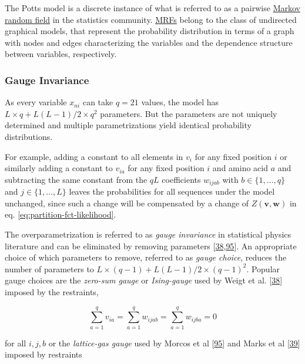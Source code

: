 \documentclass[11pt,a4paper,twoside]{book}
\renewcommand{\v}{\mathbf{v}}
\newcommand{\via}{v_{ia}}
\newcommand{\w}{\mathbf{w}}
\newcommand{\wijab}{w_{ijab}}
\theoremstyle{definition}
\theoremstyle{definition}
\theoremstyle{remark}
\begin{document}
The Potts model is a discrete instance of what is referred to as a
pairwise \protect\hyperlink{abbrev}{Markov random field} in the
statistics community. \protect\hyperlink{abbrev}{MRFs} belong to the
class of undirected graphical models, that represent the probability
distribution in terms of a graph with nodes and edges characterizing the
variables and the dependence structure between variables, respectively.

\subsubsection{Gauge Invariance}\label{gauge-invariance}

As every variable \(x_{ni}\) can take \(q=21\) values, the model has
\(L \! \times \! q + L(L-1)/2 \! \times \! q^2\) parameters. But the
parameters are not uniquely determined and multiple parametrizations
yield identical probability distributions.

For example, adding a constant to all elements in \(v_i\) for any fixed
position \(i\) or similarly adding a constant to \(\via\) for any fixed
position \(i\) and amino acid \(a\) and subtracting the same constant
from the \(qL\) coefficients \(\wijab\) with \(b \in \{1, \ldots, q\}\)
and \(j \in \{1, \ldots, L \}\) leaves the probabilities for all
sequences under the model unchanged, since such a change will be
compensated by a change of \(Z(\v, \w)\) in eq.
\eqref{eq:partition-fct-likelihood}.

The overparametrization is referred to as \emph{gauge invariance} in
statistical physics literature and can be eliminated by removing
parameters
{[}\protect\hyperlink{ref-Weigt2009}{38},\protect\hyperlink{ref-Morcos2011}{95}{]}.
An appropriate choice of which parameters to remove, referred to as
\emph{gauge choice}, reduces the number of parameters to
\(L \! \times \! (q-1) + L(L-1)/2 \! \times \! (q-1)^2\). Popular gauge
choices are the \emph{zero-sum gauge} or \emph{Ising-gauge} used by
Weigt et al. {[}\protect\hyperlink{ref-Weigt2009}{38}{]} imposed by the
restraints,

\begin{equation}
    \sum_{a=1}^{q} v_{ia} = \sum_{a=1}^{q} \wijab = \sum_{a=1}^{q} w_{ijba} = 0
\label{eq:zero-sum-gauge}
\end{equation}

for all \(i,j,b\) or the \emph{lattice-gas gauge} used by Morcos et al
{[}\protect\hyperlink{ref-Morcos2011}{95}{]} and Marks et al
{[}\protect\hyperlink{ref-Marks2011}{39}{]} imposed by restraints
\end{document}
